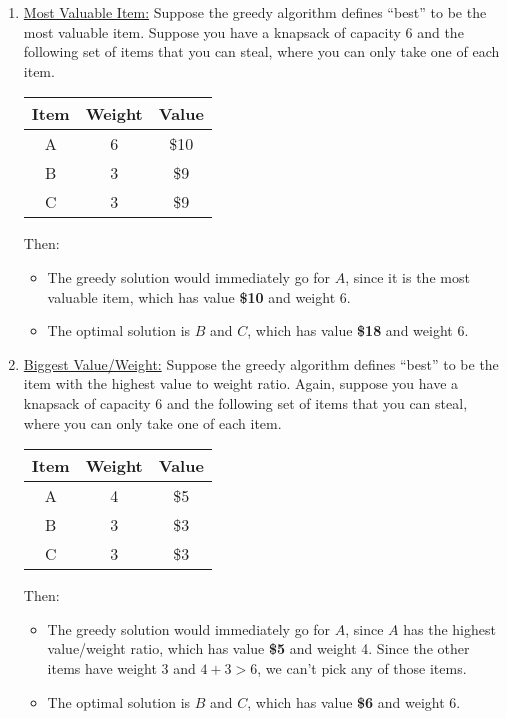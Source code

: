 \documentclass[letterpaper]{article}
\begin{document}
\begin{enumerate}
    \item \underline{Most Valuable Item:} Suppose the greedy algorithm defines ``best'' to be the most valuable item. Suppose you have a knapsack of capacity 6 and the following set of items that you can steal, where you can only take one of each item. 
    \begin{center}
        \begin{tabular}{c|c|c}
            \textbf{Item} & \textbf{Weight} & \textbf{Value} \\ 
            \hline 
            A & 6 & \$10 \\ 
            B & 3 & \$9 \\ 
            C & 3 & \$9 
        \end{tabular}
    \end{center}
    Then: 
    \begin{itemize}
        \item The greedy solution would immediately go for $A$, since it is the most valuable item, which has value \textbf{\$10} and weight 6. 
        \item The optimal solution is $B$ and $C$, which has value \textbf{\$18} and weight 6.
    \end{itemize}

    \item \underline{Biggest Value/Weight:} Suppose the greedy algorithm defines ``best'' to be the item with the highest value to weight ratio. Again, suppose you have a knapsack of capacity 6 and the following set of items that you can steal, where you can only take one of each item. 
    \begin{center}
        \begin{tabular}{c|c|c}
            \textbf{Item} & \textbf{Weight} & \textbf{Value} \\ 
            \hline 
            A & 4 & \$5 \\ 
            B & 3 & \$3 \\ 
            C & 3 & \$3 
        \end{tabular}
    \end{center}
    Then:
    \begin{itemize}
        \item The greedy solution would immediately go for $A$, since $A$ has the highest value/weight ratio, which has value \textbf{\$5} and weight 4. Since the other items have weight 3 and $4 + 3 > 6$, we can't pick any of those items.  
        \item The optimal solution is $B$ and $C$, which has value \textbf{\$6} and weight 6.
    \end{itemize}
\end{enumerate}
\end{document}
